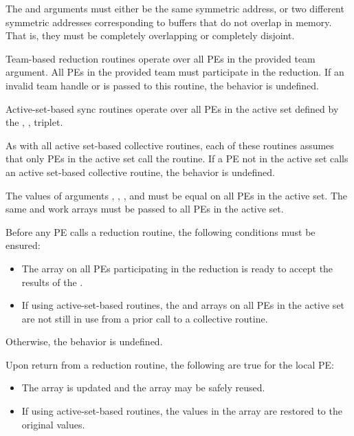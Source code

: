 \begin{apidefinition}
{    The \source{} and \dest{} arguments must either be the same symmetric
    address, or two different symmetric addresses corresponding to buffers that
    do not overlap in memory. That is, they must be completely overlapping or
    completely disjoint.

    Team-based reduction routines operate over all \acp{PE} in the provided team argument. All
    \acp{PE} in the provided team must participate in the reduction. If an invalid team handle
    or  is passed to this routine, the behavior is undefined.

    Active-set-based sync routines operate over all \acp{PE} in the active set
    defined by the , ,  triplet.

    As with all active set-based collective routines,
    each of these routines assumes
    that only \acp{PE} in the active set call the routine.  If a \ac{PE} not in
    the active set calls an active set-based collective routine,
    the behavior is undefined.

    The values of arguments , , ,
    and  must be equal on all \acp{PE} in the active set.
    The same  and  work arrays must be passed to all
    \acp{PE} in the active set.

    Before any \ac{PE} calls a reduction routine, the following conditions must be ensured:
    \begin{itemize}
    \item The \dest{} array on all \acp{PE} participating in the reduction
      is ready to accept the results of the .
    \item If using active-set-based routines, the
       and  arrays on all \acp{PE} in the
      active set are not still in use from a prior call to a collective
      \openshmem routine.
    \end{itemize}
    Otherwise, the behavior is undefined.
    
    Upon return from a reduction routine, the following are true for the local
    \ac{PE}:
    \begin{itemize}
    \item The \dest{} array is updated and the \source{} array may be safely reused.
    \item If using active-set-based routines,
    the values in the  array are restored to the original values.
    \end{itemize}

}
\end{apidefinition}
